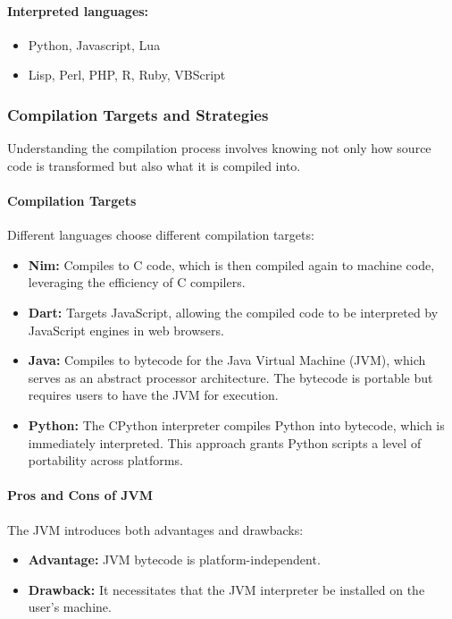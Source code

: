 \documentclass[12pt]{article}
\begin{document}
\paragraph{Interpreted languages:}
\begin{itemize}
  \item Python, Javascript, Lua
  \item Lisp, Perl, PHP, R, Ruby, VBScript
\end{itemize}

\subsubsection{Compilation Targets and Strategies}

Understanding the compilation process involves knowing not only how source code is transformed but also what it is compiled into.

\paragraph{Compilation Targets}

Different languages choose different compilation targets:

\begin{itemize}
  \item \textbf{Nim:} Compiles to C code, which is then compiled again to machine code, leveraging the efficiency of C compilers.
  \item \textbf{Dart:} Targets JavaScript, allowing the compiled code to be interpreted by JavaScript engines in web browsers.
  \item \textbf{Java:} Compiles to bytecode for the Java Virtual Machine (JVM), which serves as an abstract processor architecture. The bytecode is portable but requires users to have the JVM for execution.
  \item \textbf{Python:} The CPython interpreter compiles Python into bytecode, which is immediately interpreted. This approach grants Python scripts a level of portability across platforms.
\end{itemize}

\paragraph{Pros and Cons of JVM}

The JVM introduces both advantages and drawbacks:

\begin{itemize}
  \item \textbf{Advantage:} JVM bytecode is platform-independent.
  \item \textbf{Drawback:} It necessitates that the JVM interpreter be installed on the user's machine.
\end{itemize}
\end{document}
